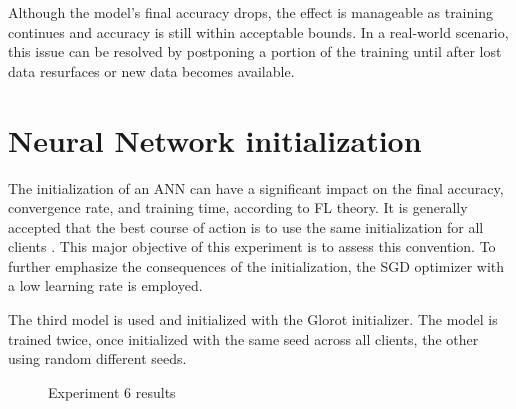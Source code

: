 Although the model's final accuracy drops, the effect is manageable as training continues and accuracy is still within acceptable bounds. In a real-world scenario, this issue can be resolved by postponing a portion of the training until after lost data resurfaces or new data becomes available.

\section{Neural Network initialization}

The initialization of an ANN can have a significant impact on the final accuracy, convergence rate, and training time, according to FL theory. It is generally accepted that the best course of action is to use the same initialization for all clients \cite{FL-original-paper}.  This major objective of this experiment is to assess this convention. To further emphasize the consequences of the initialization, the SGD optimizer with a low learning rate is employed.

\begin{table}[H]
    \center
    \caption[Experiment 6 parameters]{Experiment 6 parameters}
    \label{table:Experiment 6 parameters}
\end{table}

The third model is used and initialized with the Glorot initializer. The model is trained twice, once initialized with the same seed across all clients, the other using random different seeds.

\begin{figure}[H]
    \center
    
    \caption[Experiment 6 results]{Experiment 6 results}
    \label{fig:Experiment 6 results}
\end{figure}

